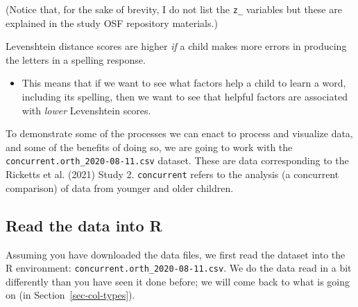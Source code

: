 \documentclass[
  letterpaper,
  DIV=11,
  numbers=noendperiod]{scrreprt}
\providecommand{\tightlist}{%
  \setlength{\itemsep}{0pt}\setlength{\parskip}{0pt}}\usepackage{longtable,booktabs,array}
\begin{document}
(Notice that, for the sake of brevity, I do not list the \texttt{z\_}
variables but these are explained in the study OSF repository
materials.)

\begin{tcolorbox}[enhanced jigsaw, opacitybacktitle=0.6, title=\textcolor{quarto-callout-warning-color}{\faExclamationTriangle}\hspace{0.5em}{Warning}, arc=.35mm, colbacktitle=quarto-callout-warning-color!10!white, colframe=quarto-callout-warning-color-frame, leftrule=.75mm, opacityback=0, breakable, titlerule=0mm, left=2mm, bottomrule=.15mm, toprule=.15mm, colback=white, coltitle=black, bottomtitle=1mm, toptitle=1mm, rightrule=.15mm]

Levenshtein distance scores are higher \emph{if} a child makes more
errors in producing the letters in a spelling response.

\begin{itemize}
\tightlist
\item
  This means that if we want to see what factors help a child to learn a
  word, including its spelling, then we want to see that helpful factors
  are associated with \emph{lower} Levenshtein scores.
\end{itemize}

\end{tcolorbox}

To demonstrate some of the processes we can enact to process and
visualize data, and some of the benefits of doing so, we are going to
work with the \texttt{concurrent.orth\_2020-08-11.csv} dataset. These
are data corresponding to the Ricketts et al. (2021) Study 2.
\texttt{concurrent} refers to the analysis (a concurrent comparison) of
data from younger and older children.

\hypertarget{sec-read-in}{%
\subsection{Read the data into R}\label{sec-read-in}}

Assuming you have downloaded the data files, we first read the dataset
into the R environment: \texttt{concurrent.orth\_2020-08-11.csv}. We do
the data read in a bit differently than you have seen it done before; we
will come back to what is going on (in Section~\ref{sec-col-types}).
\end{document}
